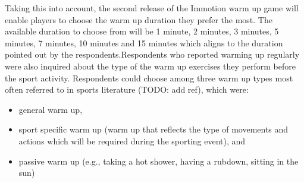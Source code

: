 Taking this into account, the second release of the Immotion warm up game will enable players to choose the warm up duration they prefer the most. The available duration to choose from will be 1 minute, 2 minutes, 3 minutes, 5 minutes, 7 minutes, 10 minutes and 15 minutes which aligns to the duration pointed out by the respondents.\pagebreak Respondents who reported warming up regularly were also inquired about the type of the warm up exercises they perform before the sport activity. Respondents could choose among three warm up types most often referred to in sports literature (TODO: add ref), which were: 
\begin{itemize}
\item general warm up,
\item sport specific warm up (warm up that reflects the type of movements and actions which will be required during the sporting event), and 
\item passive warm up (e.g., taking a hot shower, having a rubdown, sitting in the sun)

\end{itemize}
